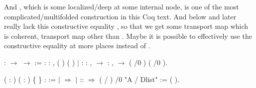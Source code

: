 \coqdocemptyline
 And , which is some localized/deep  at some internal node, is one of the most complicated/multifolded construction in this Coq text. And  below and later really lack this constructive equality , so that we get some transport map which is coherent, transport map other than . Maybe it is possible to effectively  use the constructive equality  at more places instead of . \begin{coqdoccode}
\coqdocemptyline
\end{coqdoccode}
\vspace{-.15in} \coqdoceol
\coqdocemptyline
\coqdocnoindent
{}  :  \ensuremath{\rightarrow}  \ensuremath{\rightarrow}  :=\coqdoceol
\coqdocindent{2.00em}
 : \coqdockw{\ensuremath{\forall}}  : ,  ( ) ( )\coqdoceol
\coqdocindent{1.00em}
\ensuremath{|}  : \coqdockw{\ensuremath{\forall}}   : ,    \ensuremath{\rightarrow}\coqdoceol
\coqdocindent{12.50em}
\coqdockw{\ensuremath{\forall}}   : ,    \ensuremath{\rightarrow}\coqdoceol
\coqdocindent{12.50em}
 ( /0 ) ( /0 ).

\coqdocemptyline
\begin{coqdoccode}
\end{coqdoccode}
\vspace{-.15in} \coqdoceol
\coqdocemptyline
\coqdocnoindent
{}  ( : ) ( :  ) \{ \} :  :=\coqdoceol
\coqdocindent{1.00em}
  \coqdoceol
\coqdocindent{2.00em}
\ensuremath{|}  \ensuremath{\Rightarrow} \coqdoceol
\coqdocindent{2.00em}
\ensuremath{|}  ::  \ensuremath{\Rightarrow} ( / ) /0 \coqdoceol
\coqdocnoindent
{} "A / Dlist" := (  ).

